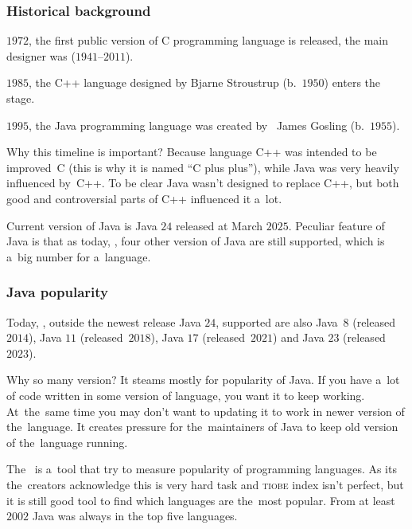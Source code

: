 \documentclass[10pt,t]{beamer}
\begin{document}
\begin{frame}
  \frametitle{Historical background}


  $1972$, the first public version of C programming language is released,
  the main designer was
  ($1941\text{--}2011$).

  $1985$, the C++ language designed by
  {Bjarne Stroustrup} (b.~$1950$) enters the stage.

  $1995$, the Java programming language was created
  by~
  {James Gosling} (b.~$1955$).

  Why this timeline is important? Because language C++ was intended to be
  improved~C (this is why it is named ``C plus plus''), while Java was very
  heavily influenced by~C++. To be clear Java \alert{wasn't} designed to
  replace C++, but both good and controversial parts of C++ influenced it
  a~lot.

  Current version of Java is Java $24$ released at March $2025$. Peculiar
  feature of Java is that as today, \currentYear, four other version of Java
  are still supported, which is a~big number for a~language.

\end{frame}





\begin{frame}
  \frametitle{Java popularity}


  Today, \currentYear, outside the newest release Java $24$, supported are
  also Java~$8$ (released~$2014$), Java $11$ (released~$2018$), Java $17$
  (released~$2021$) and Java $23$ (released~$2023$).

  Why so many version? It steams mostly for popularity of Java. If you have
  a~lot of code written in some version of language, you want it to keep
  working. At~the~same time you may don't want to updating it to work in
  newer version of the~language. It creates pressure for the~maintainers of
  Java to keep old version of the~language running.

  The~ is a~tool that try to measure popularity of
  programming languages. As its the~creators acknowledge this is very hard
  task and \textsc{tiobe} index isn't perfect, but it is still good tool to
  find which languages are the~most popular. From at least $2002$ Java was
  always in the top five languages.

\end{frame}
\end{document}
